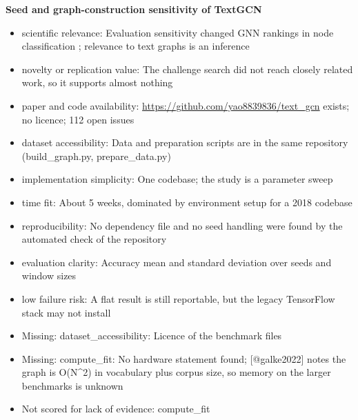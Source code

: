 \documentclass[11pt,a4paper]{article}
\begin{document}
\textbf{Seed and graph-construction sensitivity of TextGCN}
\begin{itemize}
\item scientific relevance: Evaluation sensitivity changed GNN rankings in node classification \cite{shchur2019}; relevance to text graphs is an inference
\item novelty or replication value: The challenge search did not reach closely related work, so it supports almost nothing
\item paper and code availability: \url{https://github.com/yao8839836/text_gcn} exists; no licence; 112 open issues
\item dataset accessibility: Data and preparation scripts are in the same repository (build\_graph.py, prepare\_data.py)
\item implementation simplicity: One codebase; the study is a parameter sweep
\item time fit: About 5 weeks, dominated by environment setup for a 2018 codebase
\item reproducibility: No dependency file and no seed handling were found by the automated check of the repository
\item evaluation clarity: Accuracy mean and standard deviation over seeds and window sizes
\item low failure risk: A flat result is still reportable, but the legacy TensorFlow stack may not install
\item Missing: dataset\_accessibility: Licence of the benchmark files
\item Missing: compute\_fit: No hardware statement found; [@galke2022] notes the graph is O(N\textasciicircum{}2) in vocabulary plus corpus size, so memory on the larger benchmarks is unknown
\item Not scored for lack of evidence: compute\_fit
\end{itemize}
\end{document}
